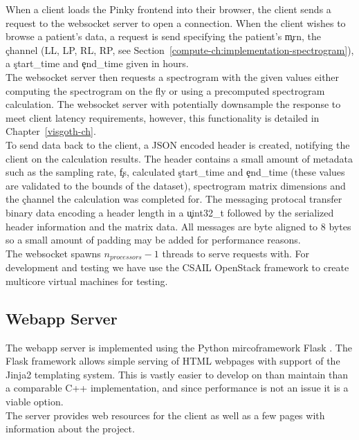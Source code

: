 When a client loads the Pinky frontend into their browser, the client sends a
request to the websocket server to open a connection. When the client wishes to
browse a patient's data, a request is send specifying the patient's \c{mrn},
the \c{channel} (LL, LP, RL, RP, see
Section~\ref{compute-ch:implementation-spectrogram}), a \c{start\_time} and
\c{end\_time} given in hours. \\

The websocket server then requests a spectrogram with the given values either
computing the spectrogram on the fly or using a precomputed spectrogram
calculation. The websocket server with potentially downsample the response to
meet client latency requirements, however, this functionality is detailed in
Chapter~\ref{visgoth-ch}. \\

To send data back to the client, a JSON encoded header is created, notifying
the client on the calculation results. The header contains a small amount of
metadata such as the sampling rate, \c{fs}, calculated \c{start\_time} and
\c{end\_time} (these values are validated to the bounds of the dataset),
spectrogram matrix dimensions and the \c{channel} the calculation was completed
for. The messaging protocal transfer binary data encoding a header length in a
\c{uint32\_t} followed by the serialized header information and the matrix data.
All messages are byte aligned to 8 bytes so a small amount of padding may be
added for performance reasons. \\

The websocket spawns $n_{processors} - 1$ threads to serve requests with. For
development and testing we have use the CSAIL OpenStack framework to create
multicore virtual machines for testing.

\subsection{Webapp Server}\label{compute-ch:implementation-webapp}

The webapp server is implemented using the Python mircoframework Flask
\cite{flask}. The Flask framework allows simple serving of HTML webpages with
support of the Jinja2 \cite{jinja2} templating system. This is vastly easier to
develop on than maintain than a comparable C++ implementation, and since
performance is not an issue it is a viable option. \\

The server provides web resources for the client as well as a few pages with
information about the project.

